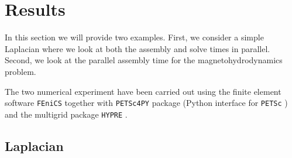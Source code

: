 \documentclass[10pt]{article}
\newcommand{\fenics}{{\tt FEniCS} }
\begin{document}



\section{Results}

In this section we will provide two examples. First, we consider a simple Laplacian where we look at both the assembly and solve times in parallel. Second, we look at the parallel assembly time for the magnetohydrodynamics problem.

The two numerical experiment have been carried out using the finite element software \fenics \cite{wells2012automated} together with {\tt PETSc4PY} package (Python interface for {\tt PETSc} \cite{petsc-user-ref,petsc-web-page}) and the multigrid package {\tt HYPRE} \cite{falgout2002hypre}.%

\subsection{Laplacian}
\end{document}

